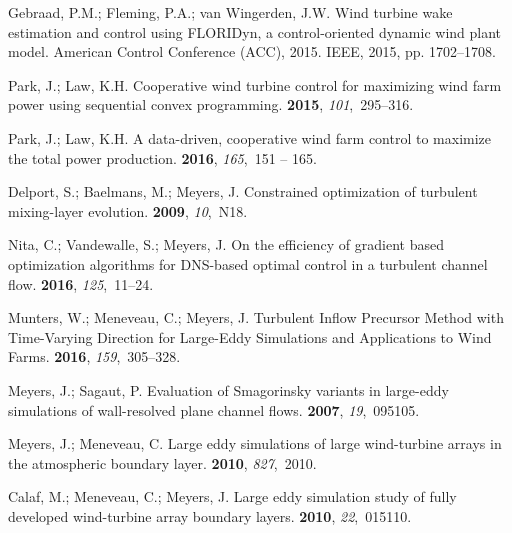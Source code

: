 \documentclass[energies,article,submit,moreauthors,latex,10pt,a4paper]{mdpi}
\begin{document}
\begin{thebibliography}{999}
	Gebraad, P.M.; Fleming, P.A.; van Wingerden, J.W.
	\newblock Wind turbine wake estimation and control using FLORIDyn, a
	control-oriented dynamic wind plant model.
	\newblock  American Control Conference (ACC), 2015. IEEE,  2015, pp.
	1702--1708.
	
	Park, J.; Law, K.H.
	\newblock Cooperative wind turbine control for maximizing wind farm power using
	sequential convex programming.
	 {\bf 2015}, {\em
		101},~295--316.
	
	Park, J.; Law, K.H.
	\newblock A data-driven, cooperative wind farm control to maximize the total
	power production.
	 {\bf 2016}, {\em 165},~151 -- 165.
	
	Delport, S.; Baelmans, M.; Meyers, J.
	\newblock Constrained optimization of turbulent mixing-layer evolution.
	 {\bf 2009}, {\em 10},~N18.
	
	Nita, C.; Vandewalle, S.; Meyers, J.
	\newblock On the efficiency of gradient based optimization algorithms for
	{DNS}-based optimal control in a turbulent channel flow.
	 {\bf 2016}, {\em 125},~11--24.
	
	Munters, W.; Meneveau, C.; Meyers, J.
	\newblock Turbulent Inflow Precursor Method with Time-Varying Direction for
	Large-Eddy Simulations and Applications to Wind Farms.
	 {\bf 2016}, {\em 159},~305--328.
	
	Meyers, J.; Sagaut, P.
	\newblock Evaluation of Smagorinsky variants in large-eddy simulations of
	wall-resolved plane channel flows.
	 {\bf 2007}, {\em 19},~095105.
	
	Meyers, J.; Meneveau, C.
	\newblock Large eddy simulations of large wind-turbine arrays in the
	atmospheric boundary layer.
	 {\bf 2010}, {\em 827},~2010.
	
	Calaf, M.; Meneveau, C.; Meyers, J.
	\newblock Large eddy simulation study of fully developed wind-turbine array
	boundary layers.
	 {\bf 2010}, {\em 22},~015110.
	

\end{thebibliography}
\end{document}
